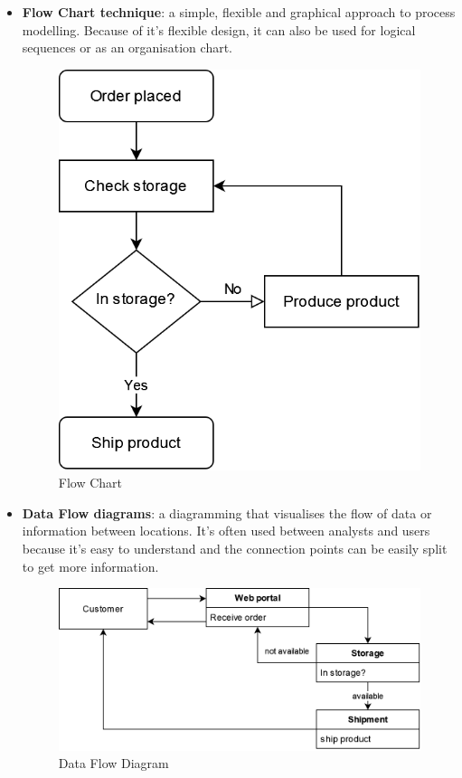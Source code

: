 \begin{itemize}
    
    \item \textbf{Flow Chart technique}: a simple, flexible and graphical approach to process modelling. Because of it's flexible design, it can also be used for logical sequences or as an organisation chart. 

    \begin{figure}[h]
    \centering
    \includegraphics[width=\textwidth/3]{images/BPMN/flow_sample.drawio.png}
    \caption{\label{fig:bpmn_flow_chart}Flow Chart}
    \end{figure}

    
    \item \textbf{Data Flow diagrams}: a diagramming that visualises the flow of data or information between locations. It's often used between analysts and users because it's easy to understand and the connection points can be easily split to get more information.

    \begin{figure}[h]
    \centering
    \includegraphics[width=\textwidth/3]{images/BPMN/dataflow_sample.drawio.png}
    \caption{\label{fig:bpmn_dataflow_diagram}Data Flow Diagram}
    \end{figure}


\end{itemize}
